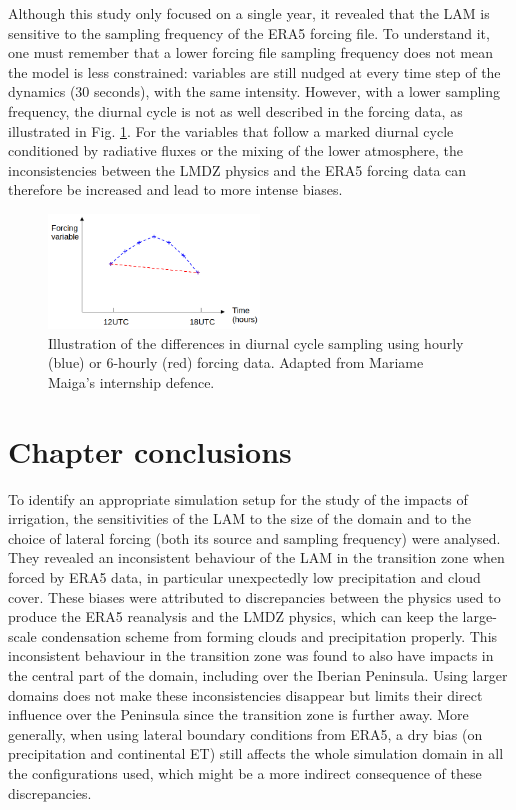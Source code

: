 Although this study only focused on a single year, it revealed that the LAM is sensitive to the sampling frequency of the ERA5 forcing file. 
To understand it, one must remember that a lower forcing file sampling frequency does not mean the model is less constrained: variables are still nudged at every time step of the dynamics (30 seconds), with the same intensity. However, with a lower sampling frequency, the diurnal cycle is not as well described in the forcing data, as illustrated in Fig. \ref{fig:diurnal_cycle_sampling}. 
For the variables that follow a marked diurnal cycle conditioned by radiative fluxes or the mixing of the lower atmosphere, the inconsistencies between the LMDZ physics and the ERA5 forcing data can therefore be increased and lead to more intense biases. 

\begin{figure}[ht]
    \centering
    \includegraphics[width=0.5\textwidth]{images/chap4/forcing_sampling_freq/sampling_freq_diurnal_cycle.png}    
    \caption{Illustration of the differences in diurnal cycle sampling using hourly (blue) or 6-hourly (red) forcing data. Adapted from Mariame Maiga's internship defence.
    \label{fig:diurnal_cycle_sampling}}
\end{figure}

\section{Chapter conclusions}

To identify an appropriate simulation setup for the study of the impacts of irrigation, the sensitivities of the LAM to the size of the domain and to the choice of lateral forcing (both its source and sampling frequency) were analysed. They revealed an inconsistent behaviour of the LAM in the transition zone when forced by ERA5 data, in particular unexpectedly low precipitation and cloud cover. These biases were attributed to discrepancies between the physics used to produce the ERA5 reanalysis and the LMDZ physics, which can keep the large-scale condensation scheme from forming clouds and precipitation properly.
This inconsistent behaviour in the transition zone was found to also have impacts in the central part of the domain, including over the Iberian Peninsula. Using larger domains does not make these inconsistencies disappear but limits their direct influence over the Peninsula since the transition zone is further away. More generally, when using lateral boundary conditions from ERA5, a dry bias (on precipitation and continental ET) still affects the whole simulation domain in all the configurations used, which might be a more indirect consequence of these discrepancies.

